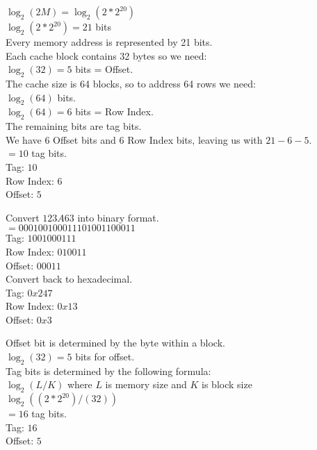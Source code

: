 \documentclass{article}
\begin{document}
\customdate{\today}

 {
     $\log_2(2M) = \log_2(2 * 2^{20})$ \\
     $\log_2(2 * 2^{20}) = 21$ bits \\
     Every memory address is represented by 21 bits. \\
     Each cache block contains 32 bytes so we need: \\
     $\log_2(32) = 5$ bits = Offset. \\
     The cache size is 64 blocks, so to address 64 rows we need: \\
     $\log_2(64)$ bits. \\
     $\log_2(64) = 6$ bits = Row Index. \\
     The remaining bits are tag bits. \\
     We have 6 Offset bits and 6 Row Index bits, leaving us with $21 - 6 - 5$. \\
     $= 10$ tag bits. \\
     Tag: $10$ \\
     Row Index: $6$ \\
     Offset: $5$ \\
}

 {
     Convert $123A63$ into binary format. \\
     $= 0001 0010 0011 1010 0110 0011$ \\
     Tag: $1001000111$ \\
     Row Index: $010011$ \\
     Offset: $00011$ \\
     Convert back to hexadecimal. \\
     Tag: $0x247$ \\
     Row Index: $0x13$ \\
     Offset: $0x3$ \\
}

 {
     Offset bit is determined by the byte within a block. \\
     $\log_2(32) = 5$ bits for offset. \\
     Tag bits is determined by the following formula: \\
     $\log_2(L/K)$ where $L$ is memory size and $K$ is block size \\
     $\log_2((2 * 2^{20}) / (32))$ \\
     $= 16$ tag bits. \\
     Tag: $16$ \\
     Offset: $5$ \\
}
\end{document}
